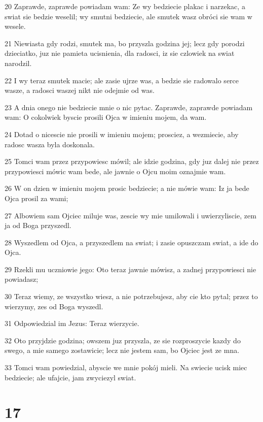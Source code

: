 \par 20 Zaprawde, zaprawde powiadam wam: Ze wy bedziecie plakac i narzekac, a swiat sie bedzie weselil; wy smutni bedziecie, ale smutek wasz obróci sie wam w wesele.
\par 21 Niewiasta gdy rodzi, smutek ma, bo przyszla godzina jej; lecz gdy porodzi dzieciatko, juz nie pamieta ucisnienia, dla radosci, iz sie czlowiek na swiat narodzil.
\par 22 I wy teraz smutek macie; ale zasie ujrze was, a bedzie sie radowalo serce wasze, a radosci waszej nikt nie odejmie od was.
\par 23 A dnia onego nie bedziecie mnie o nic pytac. Zaprawde, zaprawde powiadam wam: O cokolwiek byscie prosili Ojca w imieniu mojem, da wam.
\par 24 Dotad o nicescie nie prosili w imieniu mojem; prosciez, a wezmiecie, aby radosc wasza byla doskonala.
\par 25 Tomci wam przez przypowiesc mówil; ale idzie godzina, gdy juz dalej nie przez przypowiesci mówic wam bede, ale jawnie o Ojcu moim oznajmie wam.
\par 26 W on dzien w imieniu mojem prosic bedziecie; a nie mówie wam: Iz ja bede Ojca prosil za wami;
\par 27 Albowiem sam Ojciec miluje was, zescie wy mie umilowali i uwierzyliscie, zem ja od Boga przyszedl.
\par 28 Wyszedlem od Ojca, a przyszedlem na swiat; i zasie opuszczam swiat, a ide do Ojca.
\par 29 Rzekli mu uczniowie jego: Oto teraz jawnie mówisz, a zadnej przypowiesci nie powiadasz;
\par 30 Teraz wiemy, ze wszystko wiesz, a nie potrzebujesz, aby cie kto pytal; przez to wierzymy, zes od Boga wyszedl.
\par 31 Odpowiedzial im Jezus: Teraz wierzycie.
\par 32 Oto przyjdzie godzina; owszem juz przyszla, ze sie rozproszycie kazdy do swego, a mie samego zostawicie; lecz nie jestem sam, bo Ojciec jest ze mna.
\par 33 Tomci wam powiedzial, abyscie we mnie pokój mieli. Na swiecie ucisk miec bedziecie; ale ufajcie, jam zwyciezyl swiat.

\chapter{17}

